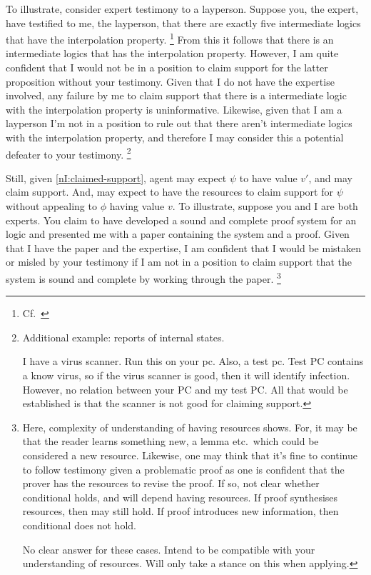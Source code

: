 \begin{note}
  To illustrate, consider expert testimony to a layperson.
  Suppose you, the expert, have testified to me, the layperson, that there are exactly five intermediate logics that have the interpolation property.\nolinebreak
  \footnote{Cf.\ \textcite{Maksimova:1977un}}
  From this it follows that there is an intermediate logics that has the interpolation property.
  However, I am quite confident that I would not be in a position to claim support for the latter proposition without your testimony.
  Given that I do not have the expertise involved, any failure by me to claim support that there is a intermediate logic with the interpolation property is uninformative.
  Likewise, given that I am a layperson I'm not in a position to rule out that there aren't intermediate logics with the interpolation property, and therefore I may consider this a potential defeater to your testimony.\nolinebreak
  \footnote{
    Additional example: reports of internal states.

    I have a virus scanner.
    Run this on your pc.
    Also, a test pc.
    Test PC contains a know virus, so if the virus scanner is good, then it will identify infection.
    However, no relation between your PC and my test PC.
    All that would be established is that the scanner is not good for claiming support.
    }

  Still, given \ref{nI:claimed-support}, agent may expect \(\psi\) to have value \(v'\), and may claim support.
  And, may expect to have the resources to claim support for \(\psi\) without appealing to \(\phi\) having value \(v\).
  To illustrate, suppose you and I are both experts.
  You claim to have developed a sound and complete proof system for an logic and presented me with a paper containing the system and a proof.
  Given that I have the paper and the expertise, I am confident that I would be mistaken or misled by your testimony if I am not in a position to claim support that the system is sound and complete by working through the paper.\nolinebreak
  \footnote{
    Here, complexity of understanding of having resources shows.
    For, it may be that the reader learns something new, a lemma etc.\ which could be considered a new resource.
    Likewise, one may think that it's fine to continue to follow testimony given a problematic proof as one is confident that the prover has the resources to revise the proof.
    If so, not clear whether conditional holds, and will depend having resources.
    If proof synthesises resources, then may still hold.
    If proof introduces new information, then conditional does not hold.

    No clear answer for these cases.
    Intend to be compatible with your understanding of resources.
    Will only take a stance on this when applying.
  }
\end{note}

